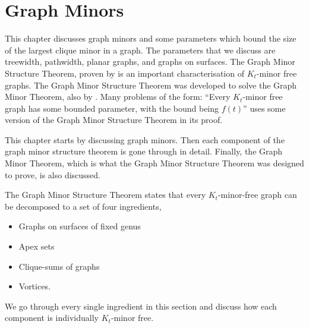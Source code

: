 \chapter{Graph Minors}\label{chap:gmst}
This chapter discusses graph minors and some parameters which bound the size of the largest clique minor in a graph. The parameters that we discuss are treewidth, pathwidth, planar graphs, and graphs on surfaces. 
The Graph Minor Structure Theorem, proven by \textcite{robertsonGraphMinorsXVI2003} is an important characterisation of $K_t$-minor free graphs. The Graph Minor Structure Theorem was developed to solve the Graph Minor Theorem, also by \textcite{robertsonGraphMinorsXX2004}. Many problems of the form: ``Every $K_t$-minor free graph has some bounded parameter, with the bound being $f(t)$'' uses some version of the Graph Minor Structure Theorem in its proof. 


This chapter starts by discussing graph minors. Then each component of the graph minor structure theorem is gone through in detail. Finally, the Graph Minor Theorem, which is what the Graph Minor Structure Theorem was designed to prove, is also discussed.

The Graph Minor Structure Theorem states that every $K_t$-minor-free graph can be decomposed to a set of four ingredients, 
\begin{itemize}
	\item Graphs on surfaces of fixed genus
	\item Apex sets
	\item Clique-sums of graphs
	\item Vortices.
\end{itemize}
We go through every single ingredient in this section and discuss how each component is individually $K_t$-minor free. 













